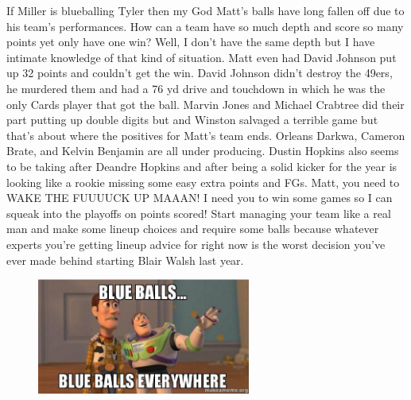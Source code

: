 \documentclass[11pt,letterpaper]{article}
\begin{document}
\newpage
{}
\par\noindent If Miller is blueballing Tyler then my God Matt's balls have long fallen off due to his team's performances. How can a team have so much depth and score so many points yet only have one win? Well, I don't have the same depth but I have intimate knowledge of that kind of situation. Matt even had David Johnson put up 32 points and couldn't get the win. David Johnson didn't destroy the 49ers, he murdered them and had a 76 yd drive and touchdown in which he was the only Cards player that got the ball. Marvin Jones and Michael Crabtree did their part putting up double digits but and Winston salvaged a terrible game but that's about where the positives for Matt's team ends. Orleans Darkwa, Cameron Brate, and Kelvin Benjamin are all under producing. Dustin Hopkins also seems to be taking after Deandre Hopkins and after being a solid kicker for the year is looking like a rookie missing some easy extra points and FGs. Matt, you need to WAKE THE FUUUUCK UP MAAAN! I need you to win some games so I can squeak into the playoffs on points scored! Start managing your team like a real man and make some lineup choices and require some balls because whatever experts you're getting lineup advice for right now is the worst decision you've ever made behind starting Blair Walsh last year.
\begin{figure}
\centering
\includegraphics[width=0.625\textwidth]{week5-blueballs.png}
\label{fig:week5-blueballs}
\end{figure}
\bigskip
\end{document}
